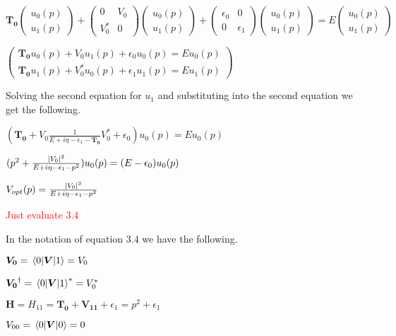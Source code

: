 \documentclass[12pt,letterpaper]{article}
\numberwithin{equation}{section}
\begin{document}
\begin{center}
$\boldsymbol{T_0}
\begin{pmatrix}
u_0(p) \\ u_1(p)
\end{pmatrix}
+
\begin{pmatrix}
0 & V_{0} \\ 
V_{0}^* & 0
\end{pmatrix}
\begin{pmatrix}
u_0(p) \\ u_1(p)
\end{pmatrix}
+
\begin{pmatrix}
\epsilon_0 & 0 \\ 
0 & \epsilon_1
\end{pmatrix}
\begin{pmatrix}
u_0(p) \\ u_1(p)
\end{pmatrix}
=
E
\begin{pmatrix}
u_0(p) \\ u_1(p)
\end{pmatrix}$
\end{center}

\begin{center}
$\begin{pmatrix}
\boldsymbol{T_0}u_0(p)+V_{0}u_1(p)+\epsilon_0u_0(p)=Eu_0(p) \\ 
\boldsymbol{T_0}u_1(p)+V_{0}^*u_0(p)+\epsilon_1u_1(p)=Eu_1(p)
\end{pmatrix}$
\end{center}

\noindent Solving the second equation for $u_1$ and substituting into the second equation we get the following.

\begin{center}
$(\boldsymbol{T_0}+V_{0}\frac{1}{E + i\eta -\epsilon_1-\boldsymbol{T_0}}V_{0}^*+\epsilon_0)u_0(p)=Eu_0(p)$
\end{center}

\begin{center}
$(p^2+\frac{\abs{V_{0}}^2}{E + i\eta -\epsilon_1-p^2} )u_0(p)=(E - \epsilon_0)u_0(p)$
\end{center}

\begin{center}
$V_{opt}(p) = \frac{\abs{V_{0}}^2}{E + i\eta - \epsilon_1 - p^2}$
\end{center}

\textcolor{red}{Just evaluate 3.4}

\noindent In the notation of equation $3.4$ we have the following.
\begin{center}
$\boldsymbol{V_0} = \matrixel{0}{\boldsymbol{V}}{1} = V_{0}$
\end{center}
\begin{center}
$\boldsymbol{V_0}^\dagger = \matrixel{0}{\boldsymbol{V}}{1}^* = V_{0}^*$
\end{center}
\begin{center}
$\boldsymbol{H} = H_{11} = \boldsymbol{T_0} + \boldsymbol{V_{11}} + \epsilon_1 = p^2 + \epsilon_1$
\end{center}
\begin{center}
$V_{00} = \matrixel{0}{\boldsymbol{V}}{0} = 0$
\end{center}
\end{document}

